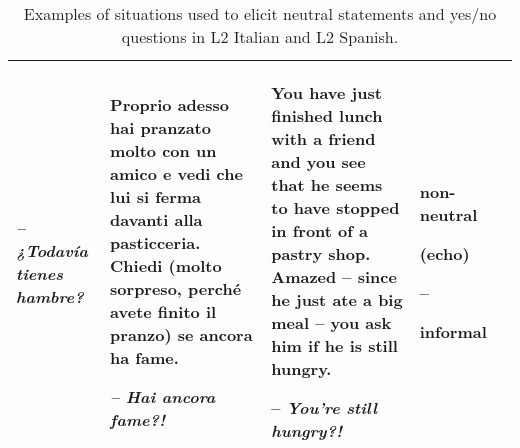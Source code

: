 \begin{sidewaystable}
\begin{tabularx}{\textwidth}{lQQQ>{\raggedright\arraybackslash}p{2cm}}
{\itshape -- ¿Todavía tienes hambre?} & Proprio adesso hai pranzato molto con un amico e vedi che lui si ferma davanti alla pasticceria. Chiedi (molto sorpreso, perché avete finito il pranzo) se ancora ha fame.

\textit{--} \textit{Hai ancora fame?!} & You have just finished lunch with a friend and you see that he seems to have stopped in front of a pastry shop. Amazed -- since he just ate a big meal -- you ask him if he is still hungry.

-- \textit{You’re still hungry?!} & non-neutral

(echo)

--

informal\\
\midrule
\end{tabularx}
\caption{\label{tab:3.1a}Examples of situations used to elicit neutral statements and yes/no questions in L2 Italian and L2 Spanish.}
\end{sidewaystable}
